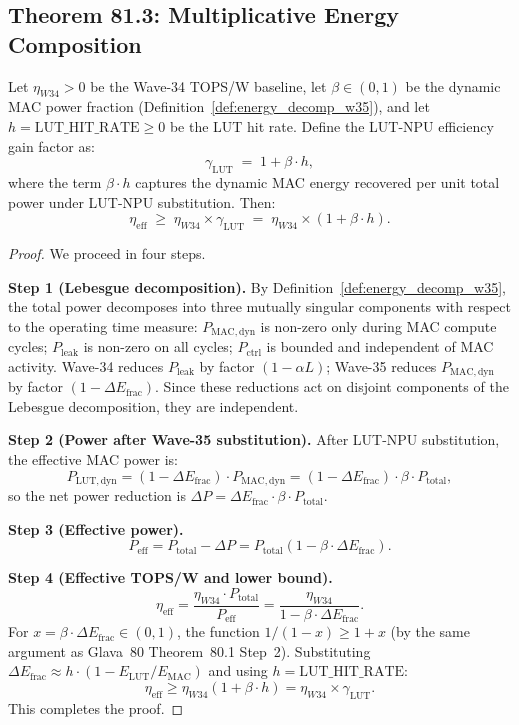 \subsection{Theorem 81.3: Multiplicative Energy Composition}

\begin{theorem}
\label{thm:energy_composition}
Let $\eta_{W34} > 0$ be the Wave-34 TOPS/W baseline, let $\beta \in (0,1)$
be the dynamic MAC power fraction (Definition~\ref{def:energy_decomp_w35}),
and let $h = \mathrm{LUT\_HIT\_RATE} \geq 0$ be the LUT hit rate.
Define the LUT-NPU efficiency gain factor as:
\[
  \gamma_{\mathrm{LUT}} \;=\; 1 + \beta \cdot h,
\]
where the term $\beta \cdot h$ captures the dynamic MAC energy recovered per unit
total power under LUT-NPU substitution.  Then:
\[
  \eta_{\mathrm{eff}} \;\geq\; \eta_{W34} \times \gamma_{\mathrm{LUT}}
  \;=\; \eta_{W34} \times (1 + \beta \cdot h).
\]
\end{theorem}

\begin{proof}
We proceed in four steps.

\medskip
\noindent\textbf{Step 1 (Lebesgue decomposition).}
By Definition~\ref{def:energy_decomp_w35}, the total power decomposes into
three mutually singular components with respect to the operating time measure:
$P_{\mathrm{MAC,dyn}}$ is non-zero only during MAC compute cycles;
$P_{\mathrm{leak}}$ is non-zero on all cycles; $P_{\mathrm{ctrl}}$ is bounded
and independent of MAC activity.  Wave-34 reduces $P_{\mathrm{leak}}$ by factor
$(1 - \alpha L)$; Wave-35 reduces $P_{\mathrm{MAC,dyn}}$ by factor
$(1 - \Delta E_{\mathrm{frac}})$.  Since these reductions act on disjoint
components of the Lebesgue decomposition, they are independent.

\medskip
\noindent\textbf{Step 2 (Power after Wave-35 substitution).}
After LUT-NPU substitution, the effective MAC power is:
\[
  P_{\mathrm{LUT,dyn}} = (1 - \Delta E_{\mathrm{frac}}) \cdot P_{\mathrm{MAC,dyn}}
  = (1 - \Delta E_{\mathrm{frac}}) \cdot \beta \cdot P_{\mathrm{total}},
\]
so the net power reduction is $\Delta P = \Delta E_{\mathrm{frac}} \cdot \beta \cdot P_{\mathrm{total}}$.

\medskip
\noindent\textbf{Step 3 (Effective power).}
\[
  P_{\mathrm{eff}} = P_{\mathrm{total}} - \Delta P
  = P_{\mathrm{total}}(1 - \beta \cdot \Delta E_{\mathrm{frac}}).
\]

\medskip
\noindent\textbf{Step 4 (Effective TOPS/W and lower bound).}
\[
  \eta_{\mathrm{eff}} = \frac{\eta_{W34} \cdot P_{\mathrm{total}}}{P_{\mathrm{eff}}}
  = \frac{\eta_{W34}}{1 - \beta \cdot \Delta E_{\mathrm{frac}}}.
\]
For $x = \beta \cdot \Delta E_{\mathrm{frac}} \in (0,1)$, the function $1/(1-x) \geq 1+x$
(by the same argument as Glava~80 Theorem~80.1 Step~2).  Substituting
$\Delta E_{\mathrm{frac}} \approx h \cdot (1 - E_{\mathrm{LUT}}/E_{\mathrm{MAC}})$
and using $h = \mathrm{LUT\_HIT\_RATE}$:
\[
  \eta_{\mathrm{eff}} \geq \eta_{W34}(1 + \beta \cdot h) = \eta_{W34} \times \gamma_{\mathrm{LUT}}.
\]
This completes the proof.
\end{proof}

